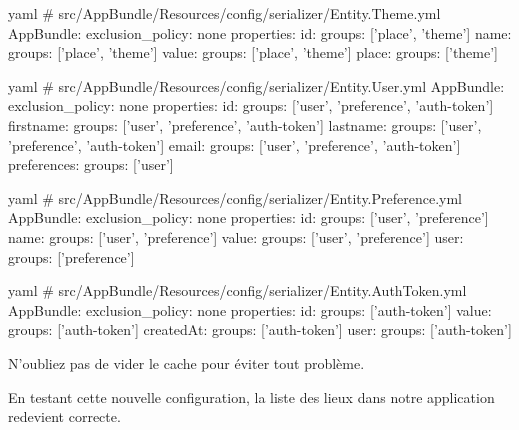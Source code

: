 \documentclass[big]{zmdocument}
\begin{document}
\begin{CodeBlock}{yaml}
# src/AppBundle/Resources/config/serializer/Entity.Theme.yml
AppBundle\Entity\Theme:
    exclusion_policy: none
    properties:
        id:
            groups: ['place', 'theme']
        name:
            groups: ['place', 'theme']
        value:
            groups: ['place', 'theme']
        place:
            groups: ['theme']
\end{CodeBlock}



\begin{CodeBlock}{yaml}
# src/AppBundle/Resources/config/serializer/Entity.User.yml
AppBundle\Entity\User:
    exclusion_policy: none
    properties:
        id:
            groups: ['user', 'preference', 'auth-token']
        firstname:
            groups: ['user', 'preference', 'auth-token']
        lastname:
            groups: ['user', 'preference', 'auth-token']
        email:
            groups: ['user', 'preference', 'auth-token']
        preferences:
            groups: ['user']
\end{CodeBlock}



\begin{CodeBlock}{yaml}
# src/AppBundle/Resources/config/serializer/Entity.Preference.yml
AppBundle\Entity\Preference:
    exclusion_policy: none
    properties:
        id:
            groups: ['user', 'preference']
        name:
            groups: ['user', 'preference']
        value:
            groups: ['user', 'preference']
        user:
            groups: ['preference']
\end{CodeBlock}



\begin{CodeBlock}{yaml}
# src/AppBundle/Resources/config/serializer/Entity.AuthToken.yml
AppBundle\Entity\AuthToken:
    exclusion_policy: none
    properties:
        id:
            groups: ['auth-token']
        value:
            groups: ['auth-token']
        createdAt:
            groups: ['auth-token']
        user:
            groups: ['auth-token']
\end{CodeBlock}



\begin{Error}
N'oubliez pas de vider le cache pour éviter tout problème.
\end{Error}


En testant cette nouvelle configuration, la liste des lieux dans notre application redevient correcte.
\end{document}
